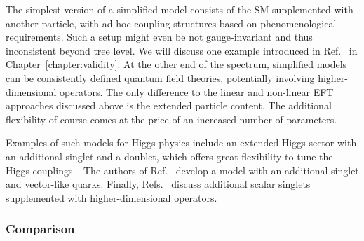 The simplest version of a simplified model consists of the SM
supplemented with another particle, with ad-hoc coupling structures
based on phenomenological requirements. Such a setup might even be not
gauge-invariant and thus inconsistent beyond tree level. We will
discuss one example introduced in Ref.~\cite{Biekotter:2016ecg} in
Chapter~\ref{chapter:validity}. At the other end of the spectrum,
simplified models can be consistently defined quantum field theories,
potentially involving higher-dimensional operators. The only
difference to the linear and non-linear EFT approaches discussed above
is the extended particle content. The additional flexibility of course
comes at the price of an increased number of parameters.

Examples of such models for Higgs physics include an extended Higgs
sector with an additional singlet and a doublet, which offers great
flexibility to tune the Higgs couplings~\cite{Lopez-Val:2013yba}. The
authors of Ref.~\cite{Dolan:2016eki} develop a model with an
additional singlet and vector-like quarks. Finally,
Refs.~\cite{Gripaios:2016xuo, Bauer:2016hcu} discuss additional scalar
singlets supplemented with higher-dimensional operators.



\subsubsection{Comparison}

